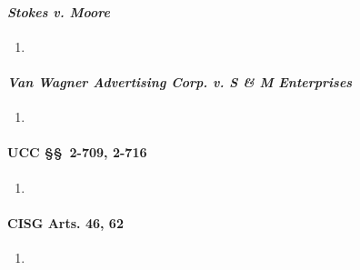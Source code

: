 \paragraph{\emph{Stokes v. Moore}}

\begin{enumerate}
    \item %
\end{enumerate}

\paragraph{\emph{Van Wagner Advertising Corp. v. S \& M Enterprises}}

\begin{enumerate}
    \item %
\end{enumerate}

\paragraph{UCC \S\S\ 2-709, 2-716}

\begin{enumerate}
    \item %
\end{enumerate}

\paragraph{CISG Arts. 46, 62}

\begin{enumerate}
    \item %
\end{enumerate}

% 
% 
% 
